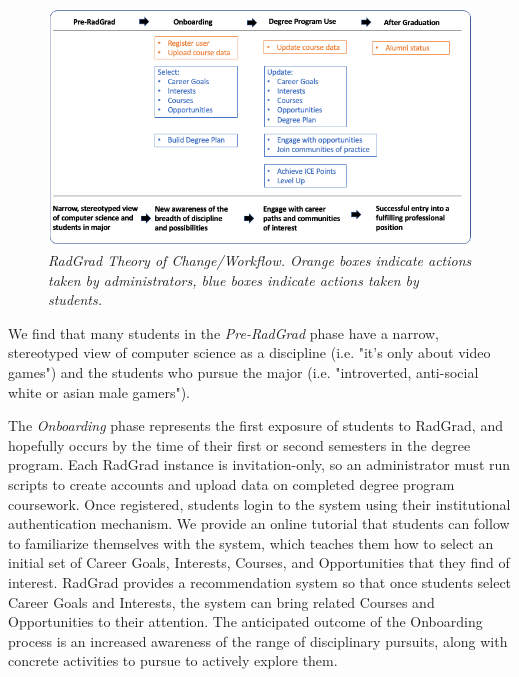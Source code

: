 \documentclass[acmsmall,nonacm]{acmart}
\begin{document}
\begin{figure}[ht]
\centering
\includegraphics[width=\linewidth]{radgrad-workflow.png}
\caption{\em RadGrad Theory of Change/Workflow. Orange boxes indicate actions taken by administrators, blue boxes indicate actions taken by students.}
\label{fig:theory-of-change}
\end{figure}

We find that many students in the {\em Pre-RadGrad} phase have a narrow, stereotyped view of computer science as a discipline (i.e. "it's only about video games") and the students who pursue the major (i.e. "introverted, anti-social white or asian male gamers").

The {\em Onboarding} phase represents the first exposure of students to RadGrad, and hopefully occurs by the time of their first or second semesters in the degree program. Each RadGrad instance is invitation-only, so an administrator must run scripts to create accounts and upload data on completed degree program coursework. Once registered, students login to the system using their institutional authentication mechanism. We provide an online tutorial that students can follow to familiarize themselves with the system, which teaches them how to select an initial set of Career Goals, Interests, Courses, and Opportunities that they find of interest. RadGrad provides a recommendation system so that once students select Career Goals and Interests, the system can bring related Courses and Opportunities to their attention.  The anticipated outcome of the Onboarding process is an increased awareness of the range of disciplinary pursuits, along with concrete activities to pursue to actively explore them.
\end{document}
